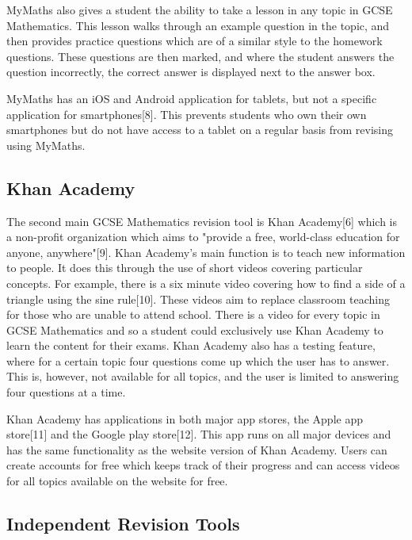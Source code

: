 \documentclass{article}
\begin{document}
MyMaths also gives a student the ability to take a lesson in any topic in GCSE Mathematics. This lesson walks through an example question in the topic, and then provides practice questions which are of a similar style to the homework questions. These questions are then marked, and where the student answers the question incorrectly, the correct answer is displayed next to the answer box. \par

MyMaths has an iOS and Android application for tablets, but not a specific application for smartphones[8]. This prevents students who own their own smartphones but do not have access to a tablet on a regular basis from revising using MyMaths. \par

\subsection{Khan Academy}

The second main GCSE Mathematics revision tool is Khan Academy[6] which is a non-profit organization which aims to "provide a free, world-class education for anyone, anywhere"[9]. Khan Academy's main function is to teach new information to people. It does this through the use of short videos covering particular concepts. For example, there is a six minute video covering how to find a side of a triangle using the sine rule[10]. These videos aim to replace classroom teaching for those who are unable to attend school. There is a video for every topic in GCSE Mathematics and so a student could exclusively use Khan Academy to learn the content for their exams. Khan Academy also has a testing feature, where for a certain topic four questions come up which the user has to answer. This is, however, not available for all topics, and the user is limited to answering four questions at a time. \par

Khan Academy has applications in both major app stores, the Apple app store[11] and the Google play store[12]. This app runs on all major devices and has the same functionality as the website version of Khan Academy. Users can create accounts for free which keeps track of their progress and can access videos for all topics available on the website for free. \par

\subsection{Independent Revision Tools}
\end{document}
